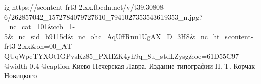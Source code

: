  
 
 
 
 

\ifcmt
  ig https://scontent-frt3-2.xx.fbcdn.net/v/t39.30808-6/262857042_1572784079727610_7941027353543619353_n.jpg?_nc_cat=101&ccb=1-5&_nc_sid=b9115d&_nc_ohc=AqUffRnu1UgAX_D_3H8&_nc_ht=scontent-frt3-2.xx&oh=00_AT-QUqWpeTYXOt1GPvsKz85_PXHZK4yh9q_8u_stdLZysg&oe=61D55C97
  @width 0.4
	@caption Киево-Печерская Лавра. Издание типографии Н. Т. Корчак-Новицкого
\fi

